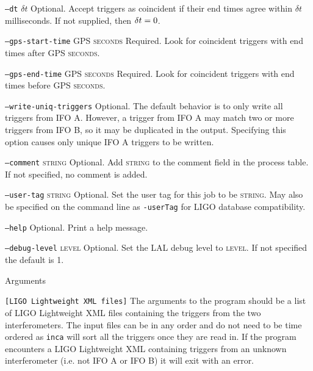 \begin{entry}
\begin{entry}
\item[\texttt{--dt} \textsc{$\delta t$}] Optional. Accept triggers as
coincident if their end times agree within $\delta t$ milliseconds.  If not
supplied,  then $\textsc{$\delta t$} = 0$.

\item[\texttt{--gps-start-time} \textsc{GPS seconds}] Required.  Look for
coincident triggers with end times after \textsc{GPS seconds}.

\item[\texttt{--gps-end-time} \textsc{GPS seconds}] Required.  Look for
coincident triggers with end times before \textsc{GPS seconds}.

\item[\texttt{--write-uniq-triggers}] Optional.  The default behavior is to
only write all triggers from IFO A. However, a trigger from IFO A
may match two or more triggers from IFO B, so it may be duplicated in the 
output. Specifying this option causes only unique IFO A triggers to be
written.

\item[\texttt{--comment} \textsc{string}] Optional. Add \textsc{string} to the
comment field in the process table. If not specified, no comment is added. 

\item[\texttt{--user-tag} \textsc{string}] Optional. Set the user tag for this
job to be \textsc{string}. May also be specified on the command line as 
\texttt{-userTag} for LIGO database compatibility.

\item[\texttt{--help}] Optional.  Print a help message.

\item[\texttt{--debug-level} \textsc{level}] Optional. Set the LAL debug
level to \textsc{level}. If not specified the default is 1.

\end{entry}

\item[Arguments]\leavevmode
\begin{entry}
\item[\texttt{[LIGO Lightweight XML files]}] The arguments to the program
should be a list of LIGO Lightweight XML files containing the triggers from
the two interferometers. The input files can be in any order and do not need
to be time ordered as \texttt{inca} will sort all the triggers once they are
read in. If the program encounters a LIGO Lightweight XML containing triggers
from an unknown interferometer (i.e. not IFO A or IFO B) it will exit with an
error.
\end{entry}


\end{entry}

